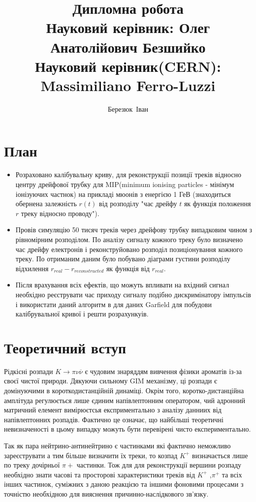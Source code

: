 \documentclass[]{article}
\author{Березюк~Іван}
\title{ Дипломна робота \\
		Науковий керівник: Олег Анатолійович Безшийко \\
		Науковий керівник(CERN): Massimiliano Ferro-Luzzi\\
		}
\begin{document}
	 \linenumbers
	\maketitle
	\newpage
	\section{ План}
	\begin{itemize}
		\item Розраховано калібувальну криву, для реконструкції позиції треків відносно центру дрейфової трубку для MIP(minimum ionising particles - мінімум іонізуючих частнок) на прикладі мюонів з енергією 1 ГеВ (знаходиться обернена залежність $r(t)$ від розподілу "час дрейфу $t$ як функція положення $r$ треку відносно проводу").\par
		\item Провів симуляцію 50 тисяч треків через дрейфову трубку випадковим чином з рівномірним розподілом. По аналізу сигналу кожного треку було визначено час дрейфу електронів і реконструйовано розподіл позиціонування кожного треку. По отриманим даним було побувано діаграми густини розподілу відхилення $r_{real} - r_{reconstructed}$ як функція від $r_{real}$.
	
		\item Після врахування всіх ефектів, що можуть впливати на вхідний сигнал необхідно реєструвати час приходу сигналу подібно дискримінатору імпульсів і використати даний алгоритм в для даних Garfield для побудови калібрувальної кривої і решти розрахункуів.
	\end{itemize}

	\newpage
	\section{Теоретичний вступ}
		Рідкісні розпади $ K \rightarrow \pi\nu \overline{\nu} $ є чудовим знаряддям вивчення фізики ароматів із-за своєї чистої природи. Дякуючи сильному GIM механізму, ці розпади є домінуючими в короткодистанційній динаміці. Окрім того, коротко-дистанційна амплітуда регулюється лише єдиним напівлептонним оператором, чий адронний матричний елемент вимірюєтсья експриментально з аналізу данниих від напівлептонних розпадів. Фактично це означає, що найбільші теоретичні невизначеності в цьому випадку можуть бути перевірені чисто експериментально.
		
		Так як пара нейтрино-антинейтрино є частинками які фактично неможливо зареєструвати а тим більше визначити їх треки, то козпад $K^+$ визначається лише по треку дочірньої $\pi+$ частинки. Тож для для реконструкції вершини розпаду необхідно знати часові та просторові характеристики треків від $K^+$ ,$\pi^+$ та всіх інших частинок, суміжних з даною реакцією та іншими фоновими процесами з точністю необхідною для вияснення причинно-наслідкового зв’язку.
		
\end{document}
